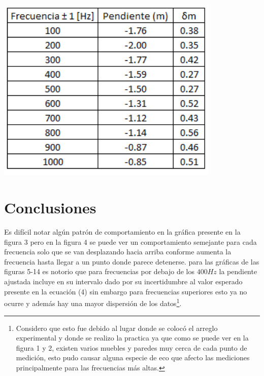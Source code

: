 \documentclass[DIV=calc, paper=a4, fontsize=11pt]{scrartcl}
\newenvironment{Figura}
  {\par\medskip\noindent\minipage{\linewidth}}
  {\endminipage\par\medskip}
\begin{document}
\begin{multicols}{2}
\begin{Figura}
\centering
    \includegraphics[width=0.8\textwidth]{pendientes.PNG}
    \label{fig}
\end{Figura}









\section*{Conclusiones}

Es difícil notar algún patrón de comportamiento en la gráfica presente en la figura 3 pero en la figura 4 se puede ver un comportamiento semejante para cada frecuencia solo que se van desplazando hacia arriba conforme aumenta la frecuencia hasta llegar a un punto donde parece detenerse. para las gráficas de las figuras 5-14 es notorio que para frecuencias por debajo de los $400 Hz$ la pendiente ajustada incluye en su intervalo dado por su incertidumbre  al valor esperado presente en la ecuación (4) sin embargo para frecuencias superiores esto ya no ocurre y además hay una mayor dispersión de los datos\footnote{Considero que esto fue debido al lugar donde se colocó el arreglo experimental y donde se realizo la practica ya que como se puede ver en la figura 1 y 2, existen varios muebles y paredes muy cerca de cada punto de medición, esto pudo causar alguna especie de eco que afecto las mediciones principalmente para las frecuencias más altas.}. 
  
\begin{thebibliography}{99}


\end{thebibliography}
\end{multicols}
\end{document}
